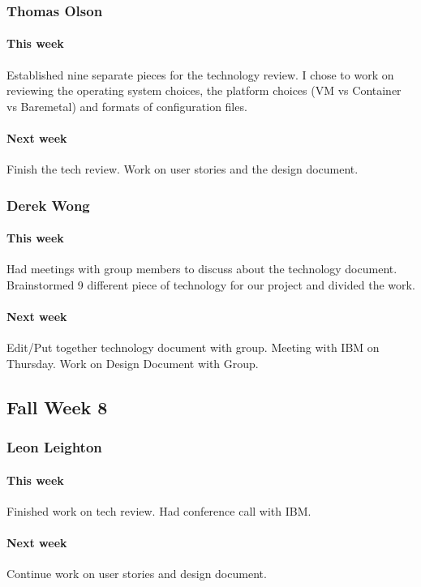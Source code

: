\documentclass[10pt,letterpaper,onecolumn,draftclsnofoot]{IEEEtran}
\begin{document}
\subsubsection{Thomas Olson}
\paragraph{This week}Established nine separate pieces for the technology review. 
I chose to work on reviewing the operating system choices, the platform choices (VM vs Container vs Baremetal) 
and formats of configuration files.
\paragraph{Next week}Finish the tech review. Work on user stories and the design document.

\subsubsection{Derek Wong}
\paragraph{This week}Had meetings with group members to discuss about the technology document.    
Brainstormed 9 different piece of technology for our project and divided the work.
\paragraph{Next week}Edit/Put together technology document with group.                         
Meeting with IBM on Thursday.        
Work on Design Document with Group.

\subsection{Fall Week 8}
\subsubsection{Leon Leighton}
\paragraph{This week}Finished work on tech review. Had conference call with IBM.
\paragraph{Next week}Continue work on user stories and design document.
\end{document}
